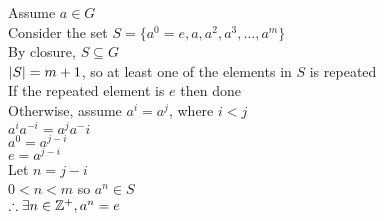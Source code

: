 \documentclass[letterpaper,12pt,fleqn]{article}
\begin{document}
\begin{theproof}
  Assume $a\in G$ \\
  Consider the set $S=\{a^0=e,a,a^2,a^3,\ldots,a^m\}$ \\
  By closure, $S\subseteq G$ \\
  $\lvert S\rvert=m+1$, so at least one of the elements in $S$ is repeated \\
  If the repeated element is $e$ then done \\
  Otherwise, assume $a^i=a^j$, where $i<j$ \\
  $a^ia^{-i}=a^ja^-i$ \\
  $a^0=a^{j-i}$ \\
  $e=a^{j-i}$ \\
  Let $n=j-i$ \\
  $0<n<m$ so $a^n\in S$ \\
  $\therefore\exists n\in\mathbb{Z}^+,a^n=e$
\end{theproof}
\end{document}
